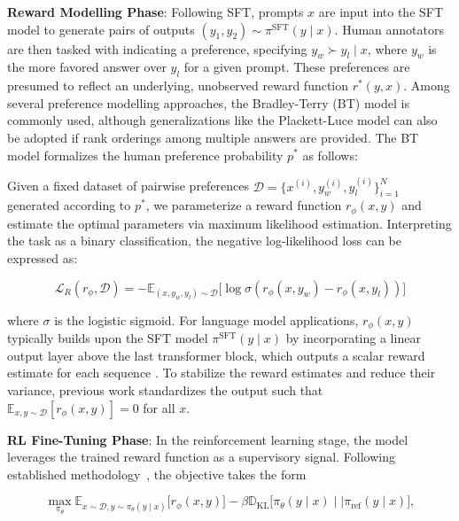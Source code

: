 \textbf{Reward Modelling Phase}: Following SFT, prompts $x$ are input into the SFT model to generate pairs of outputs $(y_1, y_2)\sim \pi^\text{SFT}(y \mid x)$. Human annotators are then tasked with indicating a preference, specifying $y_w\succ y_l \mid x$, where $y_w$ is the more favored answer over $y_l$ for a given prompt. These preferences are presumed to reflect an underlying, unobserved reward function $r^*(y, x)$. Among several preference modelling approaches, the Bradley-Terry (BT) model \cite{bradley1952rankanalysis} is commonly used, although generalizations like the Plackett-Luce model \citep{plackett1975analysis, luce2012individual} can also be adopted if rank orderings among multiple answers are provided. The BT model formalizes the human preference probability $p^*$ as follows:

Given a fixed dataset of pairwise preferences $\mathcal{D}=\bigl\{x^{(i)}, y_w^{(i)}, y_l^{(i)}\bigr\}_{i=1}^N$ generated according to $p^*$, we parameterize a reward function $r_{\phi}(x, y)$ and estimate the optimal parameters via maximum likelihood estimation. Interpreting the task as a binary classification, the negative log-likelihood loss can be expressed as:

\begin{equation}\label{eq:reward_model}
    \mathcal{L}_R(r_{\phi}, \mathcal{D}) = -\mathbb{E}_{(x, y_w, y_l)\sim \mathcal{D}}\bigl[\log \sigma(r_{\phi}(x, y_w)- r_{\phi}(x, y_l))\bigr]
\end{equation}

where $\sigma$ is the logistic sigmoid. For language model applications, $r_{\phi}(x, y)$ typically builds upon the SFT model $\pi^\text{SFT}(y \mid x)$ by incorporating a linear output layer above the last transformer block, which outputs a scalar reward estimate for each sequence \cite{ziegler2020finetuning}. To stabilize the reward estimates and reduce their variance, previous work standardizes the output such that $\mathbb{E}_{x,y\sim \mathcal{D}}\left[r_\phi(x, y)\right] = 0$ for all $x$.

\textbf{RL Fine-Tuning Phase}: In the reinforcement learning stage, the model leverages the trained reward function as a supervisory signal. Following established methodology~\citep{jaques2017sequence, jaques2020human}, the objective takes the form

\begin{equation}\label{eq:RL}
\max_{\pi_{\theta}}  \mathbb{E}_{x\sim \mathcal{D}, y\sim \pi_{\theta}(y \mid x)}\bigl[r_{\phi}(x, y)\bigr] - \beta\mathbb{D}_{\textrm{KL}}\bigl[\pi_{\theta}(y\mid x)\mid \mid \pi_\text{ref}(y\mid x)\bigr],
\end{equation}

